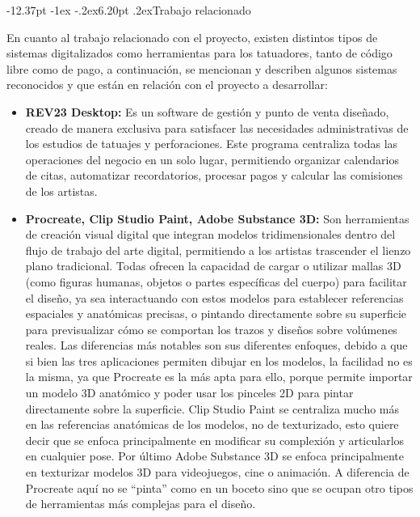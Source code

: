 \documentclass[12pt,letterpaper,oneside]{report}
\makeatletter
\renewcommand\section{\@startsection{section}{1}{\z@}%
  {-12.37pt \@plus -1ex \@minus -.2ex}{6.20pt \@plus.2ex}{\normalfont\large\bfseries}}
\makeatother
\begin{document}
\section{Trabajo relacionado}

En cuanto al trabajo relacionado con el proyecto, existen distintos tipos de sistemas digitalizados como herramientas para los tatuadores, tanto de código libre como de pago, a continuación, se mencionan y describen algunos sistemas reconocidos y que están en relación con el proyecto a desarrollar:

\begin{itemize}
  \item \textbf{ REV23 Desktop\cite{rev23}:} Es un software de gestión y punto de venta diseñado, creado de manera exclusiva para satisfacer las necesidades administrativas de los estudios de tatuajes y perforaciones. Este programa centraliza todas las operaciones del negocio en un solo lugar, permitiendo organizar calendarios de citas, automatizar recordatorios, procesar pagos y calcular las comisiones de los artistas.

  \item \textbf{Procreate, Clip Studio Paint, Adobe Substance 3D:} Son herramientas de creación visual digital que integran modelos tridimensionales dentro del flujo de trabajo del arte digital, permitiendo a los artistas trascender el lienzo plano tradicional. Todas ofrecen la capacidad de cargar o utilizar mallas 3D (como figuras humanas, objetos o partes específicas del cuerpo) para facilitar el diseño, ya sea interactuando con estos modelos para establecer referencias espaciales y anatómicas precisas, o pintando directamente sobre su superficie para previsualizar cómo se comportan los trazos y diseños sobre volúmenes reales. Las diferencias más notables son sus diferentes enfoques, debido a que si bien las tres aplicaciones permiten dibujar en los modelos, la facilidad no es la misma, ya que Procreate\cite{procreate} es la más apta para ello, porque permite importar un modelo 3D anatómico y poder usar los pinceles 2D para pintar directamente sobre la superficie. Clip Studio Paint\cite{clipstudio} se centraliza mucho más en las referencias anatómicas de los modelos, no de texturizado, esto quiere decir que se enfoca principalmente en modificar su complexión y articularlos en cualquier pose. Por último Adobe Substance 3D\cite{substance} se enfoca principalmente en texturizar modelos 3D para videojuegos, cine o animación. A diferencia de Procreate aquí no se ``pinta'' como en un boceto sino que se ocupan otro tipos de herramientas más complejas para el diseño.


\end{itemize}
\end{document}

